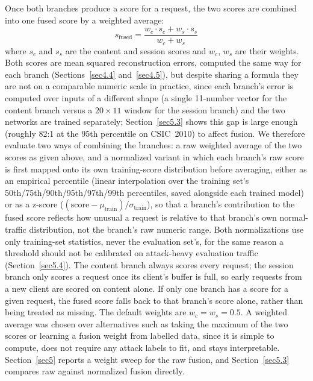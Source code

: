 \documentclass[futureinternet,article,submit,moreauthors]{Definitions/mdpi}
\begin{document}
Once both branches produce a score for a request, the two scores are combined into one fused score by a weighted average:
\begin{equation}
s_{\text{fused}} = \frac{w_c \cdot s_c + w_s \cdot s_s}{w_c + w_s}
\end{equation}
where $s_c$ and $s_s$ are the content and session scores and $w_c$, $w_s$ are their weights. Both scores are mean squared reconstruction errors, computed the same way for each branch (Sections~\ref{sec4.4} and~\ref{sec4.5}), but despite sharing a formula they are not on a comparable numeric scale in practice, since each branch's error is computed over inputs of a different shape (a single 11-number vector for the content branch versus a $20\times11$ window for the session branch) and the two networks are trained separately; Section~\ref{sec5.3} shows this gap is large enough (roughly 82:1 at the 95th percentile on CSIC~2010) to affect fusion. We therefore evaluate two ways of combining the branches: a raw weighted average of the two scores as given above, and a normalized variant in which each branch's raw score is first mapped onto its own training-score distribution before averaging, either as an empirical percentile (linear interpolation over the training set's 50th/75th/90th/95th/97th/99th percentiles, saved alongside each trained model) or as a z-score ($(\text{score}-\mu_{\text{train}})/\sigma_{\text{train}}$), so that a branch's contribution to the fused score reflects how unusual a request is relative to that branch's own normal-traffic distribution, not the branch's raw numeric range. Both normalizations use only training-set statistics, never the evaluation set's, for the same reason a threshold should not be calibrated on attack-heavy evaluation traffic (Section~\ref{sec5.4}). The content branch always scores every request; the session branch only scores a request once its client's buffer is full, so early requests from a new client are scored on content alone. If only one branch has a score for a given request, the fused score falls back to that branch's score alone, rather than being treated as missing. The default weights are $w_c = w_s = 0.5$. A weighted average was chosen over alternatives such as taking the maximum of the two scores or learning a fusion weight from labelled data, since it is simple to compute, does not require any attack labels to fit, and stays interpretable. Section~\ref{sec5} reports a weight sweep for the raw fusion, and Section~\ref{sec5.3} compares raw against normalized fusion directly.
\end{document}
